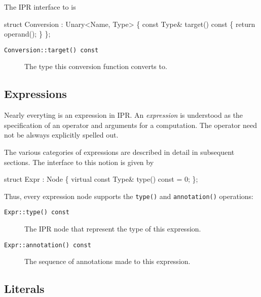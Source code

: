 \documentclass[letter,11pt]{article}
\begin{document}
The IPR interface to  is
\begin{Program}
   struct Conversion : Unary<Name, Type> \{
      const Type& target() const \{ return operand(); \}
   \};
\end{Program}
\begin{description}
\item[\texttt{Conversion::target() const}] The type this conversion function
  converts to. 
\end{description}

\subsection{Expressions}

Nearly everyting is an expression in IPR.  An \emph{expression} is understood
as the specification of an operator and arguments for a computation.  The
operator need not be alsways explicitly spelled out.

The various categories of expressions are described in detail in subsequent
sections.  The interface to this notion is given by
\begin{Program}
   struct Expr : Node \{
      virtual const Type& type() const = 0;
   \};
\end{Program}
Thus, every expression node supports the \texttt{type()} and
\texttt{annotation()} operations:
\begin{description}
\item[\texttt{Expr::type() const}] The IPR node that represent the type of
  this expression.
\item[\texttt{Expr::annotation() const}] The sequence of annotations made to
  this expression.
\end{description}



\subsection{Literals}


\end{document}

